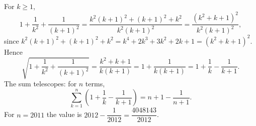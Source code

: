 For $k\ge1$,
\[
1+\dfrac{1}{k^2}+\dfrac{1}{(k+1)^2}=\dfrac{k^2(k+1)^2+(k+1)^2+k^2}{k^2(k+1)^2}=\dfrac{\left(k^2+k+1\right)^2}{k^2(k+1)^2},
\]
since $k^2(k+1)^2+(k+1)^2+k^2=k^4+2k^3+3k^2+2k+1=\left(k^2+k+1\right)^2$. Hence
\[
\sqrt{1+\dfrac{1}{k^2}+\dfrac{1}{(k+1)^2}}=\dfrac{k^2+k+1}{k(k+1)}=1+\dfrac{1}{k(k+1)}=1+\dfrac{1}{k}-\dfrac{1}{k+1}.
\]
The sum telescopes: for $n$ terms,
\[
\sum_{k=1}^{n}\left(1+\dfrac{1}{k}-\dfrac{1}{k+1}\right)=n+1-\dfrac{1}{n+1}.
\]
For $n=2011$ the value is $\boxed{2012-\dfrac{1}{2012}=\dfrac{4048143}{2012}}$.
